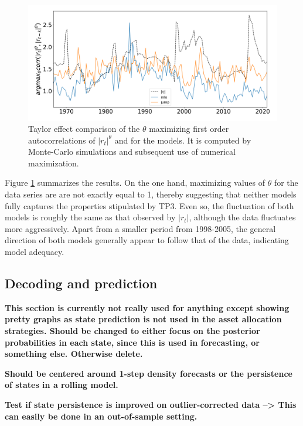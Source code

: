 \begin{figure}[H] 
    \centering
    \includegraphics[width=1.0\textwidth]{analysis/stylized_facts/images/taylor_effect.png}
    \caption[Taylor effect comparison of the $\theta$ maximizing first order autocorrelations of $|r_t|^{\theta}$ and for the models]{Taylor effect comparison of the $\theta$ maximizing first order autocorrelations of $|r_t|^{\theta}$ and for the models. It is computed by Monte-Carlo simulations and subsequent use of numerical maximization.}
    \label{fig:stylized_facts_taylor_effect} 
\end{figure}

Figure \ref{fig:stylized_facts_taylor_effect} summarizes the results. On the
one hand, maximizing values of $\theta$ for the data series are are not exactly equal to 1, thereby suggesting that neither models fully captures the properties stipulated by TP3. Even so, the fluctuation of both models is roughly the same as that observed by $|r_t|$, although the data fluctuates more aggressively. Apart from a smaller period from 1998-2005, the general direction of both models generally appear to follow that of the data, indicating model adequacy.

\subsection{Decoding and prediction}

\textbf{This section is currently not really used for anything except showing pretty graphs as state prediction is not used in the asset allocation strategies. Should be changed to either focus on the posterior probabilities in each state, since this is used in forecasting, or something else. Otherwise delete.}

\textbf{Should be centered around 1-step density forecasts or the persistence of states in a rolling model.}

\textbf{Test if state persistence is improved on outlier-corrected data --> This can easily be done in an out-of-sample setting.}


